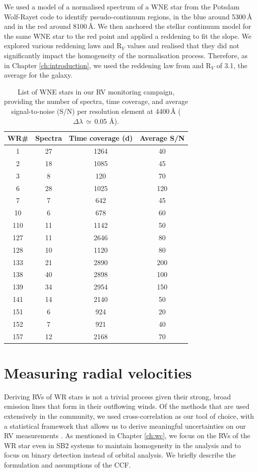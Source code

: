 We used a model of a normalised spectrum of a WNE star from the Potsdam Wolf-Rayet code \citep[PoWR:][]{grafener_line-blanketed_2002,hamann_temperature_2003,2004HamannGrafenerWN,2015TodtWNmodels} to identify pseudo-continuum regions, in the blue around 5300\,\r{A} and in the red around 8100\,\r{A}. We then anchored the stellar continuum model for the same WNE star to the red point and applied a reddening to fit the slope. We explored various reddening laws and R$_V$ values and realised that they did not significantly impact the homogeneity of the normalisation process. Therefore, as in Chapter \ref{ch:introduction}, we used the reddening law from \citet{2004Fitzpatrick} and R$_V$ of 3.1, the average for the galaxy.

\begin{table}
\centering
\caption{List of WNE stars in our RV monitoring campaign, providing the number of spectra, time coverage, and average signal-to-noise (S/N) per resolution element at 4400\,\r{A} ($\Delta\lambda\,\simeq\,$0.05 \r{A}).}
\begin{tabular}{cccc}
\hline \hline
WR\#&Spectra&Time coverage (d)&Average S/N \\ \hline
1&27&1264&40 \\
2&18&1085&45 \\
3&8&120&70 \\
6&28&1025&120 \\
7&7&642&45 \\
10&6&678&60 \\
110&11&1142&50 \\
127&11&2646&80 \\
128&10&1120&80 \\
133&21&2890&200 \\
138&40&2898&100 \\
139&34&2954&150 \\
141&14&2140&50 \\
151&6&924&20 \\
152&7&921&40 \\
157&12&2168&70 \\ \hline

\end{tabular}
\label{tab:wr_epochs}
\end{table}

\section{Measuring radial velocities}\label{sect:RVdet_WNE}
Deriving RVs of WR stars is not a trivial process given their strong, broad emission lines that form in their outflowing winds. Of the methods that are used extensively in the community, we used cross-correlation as our tool of choice, with a statistical framework that allows us to derive meaningful uncertainties on our RV measurements \citep[][see Chapter \ref{ch:wc} for more details]{2003Zucker}. As mentioned in Chapter \ref{ch:wc}, we focus on the RVs of the WR star even in SB2 systems to maintain homogeneity in the analysis and to focus on binary detection instead of orbital analysis. We briefly describe the formulation and assumptions of the CCF.

